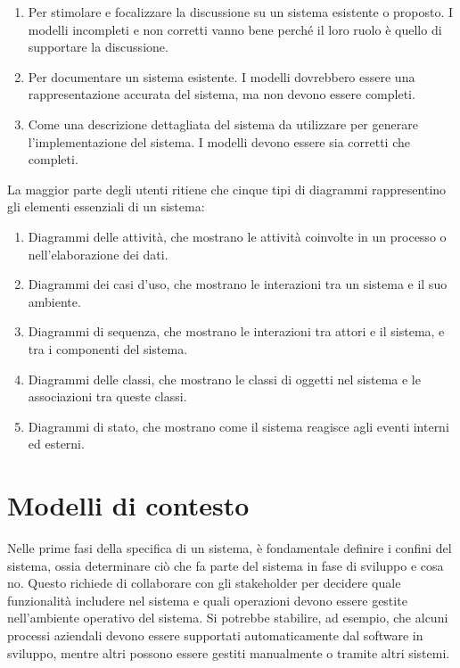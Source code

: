 \begin{enumerate}
    \item Per stimolare e focalizzare la discussione su un sistema esistente o proposto. I modelli incompleti e non corretti vanno bene perché il loro ruolo è quello di supportare la discussione.
    \item Per documentare un sistema esistente. I modelli dovrebbero essere una rappresentazione accurata del sistema, ma non devono essere completi.
    \item Come una descrizione dettagliata del sistema da utilizzare per generare l'implementazione del sistema. I modelli devono essere sia corretti che completi.
\end{enumerate}
La maggior parte degli utenti ritiene che cinque tipi di diagrammi rappresentino gli elementi essenziali di un sistema:

\begin{enumerate}
    \item Diagrammi delle attività, che mostrano le attività coinvolte in un processo o nell'elaborazione dei dati.
    \item Diagrammi dei casi d'uso, che mostrano le interazioni tra un sistema e il suo ambiente.
    \item Diagrammi di sequenza, che mostrano le interazioni tra attori e il sistema, e tra i componenti del sistema.
    \item Diagrammi delle classi, che mostrano le classi di oggetti nel sistema e le associazioni tra queste classi.
    \item Diagrammi di stato, che mostrano come il sistema reagisce agli eventi interni ed esterni.
\end{enumerate}

\section{Modelli di contesto}
Nelle prime fasi della specifica di un sistema, è fondamentale definire i confini del sistema, ossia determinare ciò che fa parte del sistema in fase di sviluppo e cosa no. Questo richiede di collaborare con gli stakeholder per decidere quale funzionalità includere nel sistema e quali operazioni devono essere gestite nell'ambiente operativo del sistema. Si potrebbe stabilire, ad esempio, che alcuni processi aziendali devono essere supportati automaticamente dal software in sviluppo, mentre altri possono essere gestiti manualmente o tramite altri sistemi.

